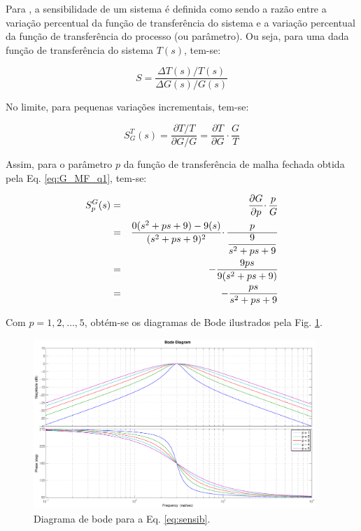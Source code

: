 Para , a sensibilidade de um sistema é definida como sendo
a razão entre a variação percentual da função de transferência do sistema e a
variação percentual da função de transferência do processo (ou parâmetro). Ou
seja, para uma dada função de transferência do sistema $T(s)$, tem-se:

\begin{equation}
S = \frac{\Delta T(s)/T(s)}{\Delta G(s)/G(s)}
\end{equation}

No limite, para pequenas variações incrementais, tem-se:

\begin{equation}
S_G^T(s) = \frac{\partial T / T}{ \partial G / G} 
         = \frac{\partial T}{\partial G} \cdotp \frac{G}{T}
\end{equation}

Assim, para o parâmetro $p$ da função de transferência de malha fechada
obtida pela Eq. \ref{eq:G_MF_q1}, tem-se:

\begin{eqnarray}
S_p^G(s) & = & \frac{\partial G}{\partial p} \cdotp \frac{p}{G}\nonumber \\
         & = & \frac{0(s^2 + ps + 9) - 9(s)}{(s^2 + ps + 9)^2} \cdotp
               \frac{p}{\displaystyle\frac{9}{s^2 + ps + 9}}\nonumber\\
         & = & - \frac{9ps}{9(s^2 + ps + 9)}\nonumber\\
         & = & - \frac{ps}{s^2 + ps + 9}\label{eq:sensib}
\end{eqnarray}

Com $p = 1\text{,}\ 2\text{,}\ \ldots\text{,}\ 5$, obtém-se os diagramas de Bode
ilustrados pela Fig. \ref{fig:diag_bode_sensib}.

\begin{figure}[H]
\centering
    \includegraphics[width=0.95\textwidth]{imgs/questao1/bode_sensib}
    \caption{Diagrama de bode para a Eq. \ref{eq:sensib}.}
    \label{fig:diag_bode_sensib}
\end{figure}

